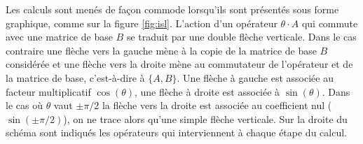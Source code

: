 Les calculs sont menés de façon commode lorsqu'ils 
sont présentés sous forme graphique, comme sur la figure \ref{fig:isl}. 
L'action d'un opérateur $\theta \cdot A$ qui commute avec une 
matrice de base $B$ se traduit par une double flèche verticale.
Dans le cas contraire une 
flèche vers la gauche mène à la copie de la matrice de base $B$ considérée 
et une flèche vers la droite mène au commutateur de l'opérateur et de la matrice de base,
c'est-à-dire à $\{A,B\}$. 
Une flèche à gauche est associée au facteur multiplicatif $\cos(\theta)$, 
une flèche à droite est associée à $\sin(\theta)$. 
Dans le cas où $\theta$ vaut $\pm \pi/2$ la flèche vers la droite est 
associée au coefficient nul ($\sin(\pm\pi/2)$), 
on ne trace alors qu'une simple flèche verticale.
Sur la droite du schéma sont indiqués les opérateurs qui interviennent
à chaque étape du calcul.

